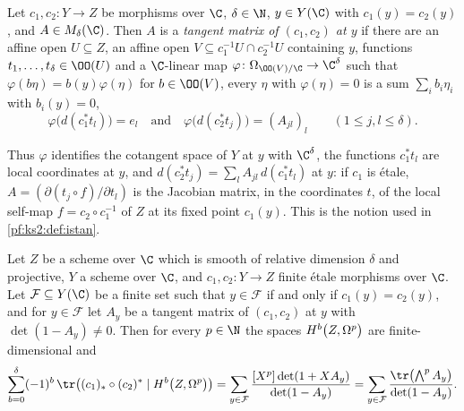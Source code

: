 \begin{definition}\label{pf:geo:istan}
Let $c_1,c_2\colon Y\to Z$ be morphisms over $\C$, $\delta\in\N$, $y\in Y(\C)$ with $c_1(y)=c_2(y)$, and $A\in M_\delta(\C)$. Then $A$ is a
\emph{tangent matrix of $(c_1,c_2)$ at $y$} if there are an affine open $U\subseteq Z$, an affine open $V\subseteq c_1^{-1}U\cap c_2^{-1}U$
containing $y$, functions $t_1,\dots,t_\delta\in\OO(U)$ and a $\C$-linear map $\varphi\colon\Omega_{\OO(V)/\C}\to\C^\delta$ such that
$\varphi(b\eta)=b(y)\varphi(\eta)$ for $b\in\OO(V)$, every $\eta$ with $\varphi(\eta)=0$ is a sum $\sum_ib_i\eta_i$ with $b_i(y)=0$,
\[
  \varphi\bigl(d(c_1^*t_l)\bigr)=e_l\quad\text{and}\quad\varphi\bigl(d(c_2^*t_j)\bigr)=(A_{jl})_{l}\qquad(1\le j,l\le\delta).
\]
\end{definition}

Thus $\varphi$ identifies the cotangent space of $Y$ at $y$ with $\C^\delta$, the functions $c_1^*t_l$ are local coordinates at $y$, and
$d(c_2^*t_j)=\sum_lA_{jl}\,d(c_1^*t_l)$ at $y$: if $c_1$ is \'etale, $A=(\partial(t_j\circ f)/\partial t_l)$ is the Jacobian matrix, in the
coordinates $t$, of the local self-map $f=c_2\circ c_1^{-1}$ of $Z$ at its fixed point $c_1(y)$. This is the notion used in
\cref{pf:ks2:def:istan}.

\begin{theorem}\label{pf:geo:hlf}
Let $Z$ be a scheme over $\C$ which is smooth of relative dimension $\delta$ and projective, $Y$ a scheme over $\C$, and
$c_1,c_2\colon Y\to Z$ finite \'etale morphisms over $\C$. Let $\mathcal F\subseteq Y(\C)$ be a finite set such that $y\in\mathcal F$ if and only
if $c_1(y)=c_2(y)$, and for $y\in\mathcal F$ let $A_y$ be a tangent matrix of $(c_1,c_2)$ at $y$ with $\det(1-A_y)\ne0$. Then for every
$p\in\N$ the spaces $\geoHdg{Z}{p}{b}$ are finite-dimensional and
\begin{equation}\label{eq:pf:geo:hlf}
  \sum_{b=0}^{\delta}(-1)^b\,\tr\bigl((c_1)_*\circ(c_2)^*\mid\geoHdg{Z}{p}{b}\bigr)
  =\sum_{y\in\mathcal F}\frac{[X^p]\det(1+XA_y)}{\det(1-A_y)}
  =\sum_{y\in\mathcal F}\frac{\tr\bigl(\bigwedge^pA_y\bigr)}{\det(1-A_y)}.
\end{equation}
\end{theorem}

